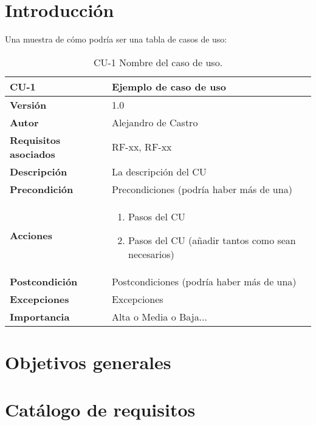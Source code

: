 
\section{Introducción}

Una muestra de cómo podría ser una tabla de casos de uso:

\begin{table}[p]
	\centering
	\begin{tabularx}{\linewidth}{ p{} p{} }
		\toprule
		\textbf{CU-1}    & \textbf{Ejemplo de caso de uso}\\
		\toprule
		\textbf{Versión}              & 1.0    \\
		\textbf{Autor}                & {Alejandro de Castro} \\
		\textbf{Requisitos asociados} & RF-xx, RF-xx \\
		\textbf{Descripción}          & La descripción del CU \\
		\textbf{Precondición}         & Precondiciones (podría haber más de una) \\
		\textbf{Acciones}             &
		\begin{enumerate}
			\def\labelenumi{\arabic{enumi}.}
			\tightlist
			\item Pasos del CU
			\item Pasos del CU (añadir tantos como sean necesarios)
		\end{enumerate}\\
		\textbf{Postcondición}        & Postcondiciones (podría haber más de una) \\
		\textbf{Excepciones}          & Excepciones \\
		\textbf{Importancia}          & Alta o Media o Baja... \\
		\bottomrule
	\end{tabularx}
	\caption{CU-1 Nombre del caso de uso.}
\end{table}

\section{Objetivos generales}

\section{Catálogo de requisitos}

